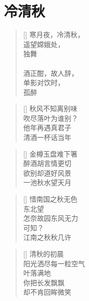 \chapter{冷清秋}
\thispagestyle{empty}
\renewcommand{\poemtoc}{section}
\settowidth{\versewidth}{寒月夜，冷清秋}
\begin{verse}[\versewidth]
寒月夜，冷清秋，\\
遥望嫦娥处，\\
独舞\\
~\\
酒正酣，故人辞，\\
单影对饮时，\\
孤醉
\end{verse}

\renewcommand{\poemtoc}{section}
\settowidth{\versewidth}{秋风不知离别味}
\begin{verse}[\versewidth]
秋风不知离别味\\
吹尽落叶为谁别？\\
他年再遇真君子\\
清酒一杯话当年
\end{verse}

\renewcommand{\poemtoc}{section}
\settowidth{\versewidth}{秋风不知离别味}
\begin{verse}[\versewidth]
金樽玉盘难下箸\\
醉酒胡言情更切\\
欲别却道好风景\\
一池秋水望天月
\end{verse}

\renewcommand{\poemtoc}{section}
\settowidth{\versewidth}{惜南国之秋无色}
\begin{verse}[\versewidth]
惜南国之秋无色\\
东北望\\
怎奈故园东风无力\\
可知？\\
江南之秋秋几许
\end{verse}
\newpage

\renewcommand{\poemtoc}{section}
\settowidth{\versewidth}{清秋的初晨}
\begin{verse}[\versewidth]
清秋的初晨\\
阳光洒尽每一粒空气\\
叶落满地\\
你把长发飘飘\\
却不肯回眸微笑
\end{verse}
